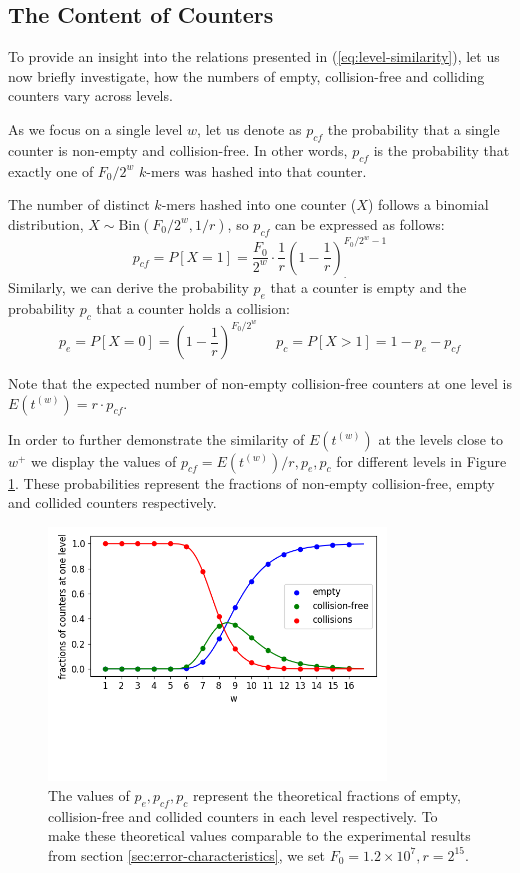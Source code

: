\subsection{The Content of Counters}
To provide an insight into the relations presented in (\ref{eq:level-similarity}),
let us now briefly investigate, how the numbers of empty,
collision-free and colliding counters vary across levels.

As we focus on a single level $w$, let us denote as $p_{cf}$ the probability
that a single counter is non-empty and collision-free. In other words, $p_{cf}$ is the 
probability that exactly one of $F_0/2^w$ $k$-mers was hashed into that counter.

The number of distinct $k$-mers hashed into one counter ($X$)
follows a binomial distribution, $X \sim \mathrm{Bin}(F_0/2^w, 1/r)$, 
so $p_{cf}$ can be expressed as follows:
\begin{equation} \label{eq:pcf}
p_{cf} = P[X=1] = \frac{F_0}{2^w} \cdot \frac{1}{r} \left(1 - \frac{1}{r}\right)^{F_0/2^w - 1}_{.}
\end{equation}
Similarly, we can derive the probability $p_e$ that a counter is empty and the probability 
$p_c$ that a counter holds a collision:
$$p_e = P[X=0] = \left(1 - \frac{1}{r}\right)^{F_0/2^w} ~~~~~~ p_c = P[X>1] = 1 - p_e - p_{cf}$$

Note that the expected number of non-empty collision-free counters at one level is 
$E(t^{(w)}) = r \cdot p_{cf}$. 

In order to further demonstrate the similarity of $E(t^{(w)})$ at the levels close to $w^+$ we
display the values of $p_{cf} = E(t^{(w)}) / r, p_e, p_c$ for different levels in
Figure \ref{img:pe-pcf-pc}. These probabilities represent the fractions of 
non-empty collision-free, empty and collided counters respectively. 

\begin{figure}[h]
\centerline{\includegraphics[width=0.8\textwidth, trim={0cm, 3.5cm, 0cm, 0cm}, clip]{images/pcf.png}}
\caption[Plot of $p_e, p_{cf}, p_c$ across the levels]{The values of $p_e, p_{cf}, p_c$ 
represent the theoretical fractions of empty, collision-free and collided counters in
each level respectively. To make these theoretical values comparable to the experimental
results from section \ref{sec:error-characteristics}, we set $F_0 = 1.2 \times 10^7, r = 2^{15}$.} 
\label{img:pe-pcf-pc}
\end{figure}

